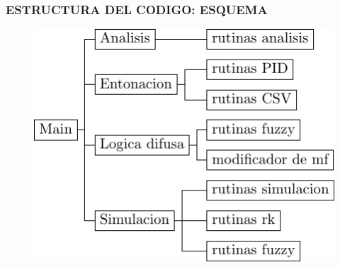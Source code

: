 \documentclass[usenames,xcolor={dvipsnames, table}]{beamer}
\begin{document}
\begin{frame}
	\frametitle{ESTRUCTURA DEL CODIGO: ESQUEMA}
	\vspace{20pt}
	\begin{figure}
		\includegraphics[width=0.9\linewidth]{imagenes/estructuraMain.pdf}
	\end{figure}
\end{frame}
\end{document}
